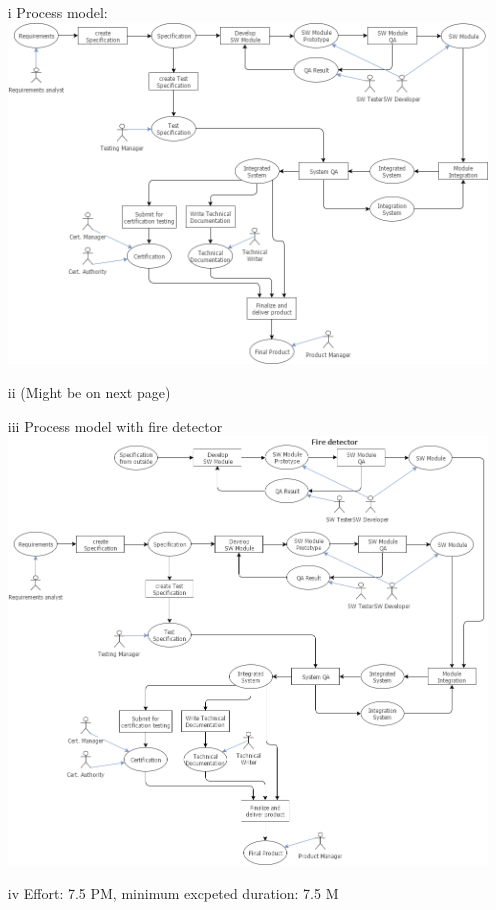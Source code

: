 \documentclass{scrartcl}
\begin{document}
\begin{itemize}
    \item[i] Process model: \\ 
    	\includegraphics[width=\textwidth]{swt_2_1.png}
    \item[ii] (Might be on next page)
        
    \item[iii] Process model with fire detector\\
    	\includegraphics[width=\textwidth]{swt_2_3.png}
    \item[iv] Effort: 7.5 PM, minimum excpeted duration: 7.5 M
\end{itemize}
\end{document}
